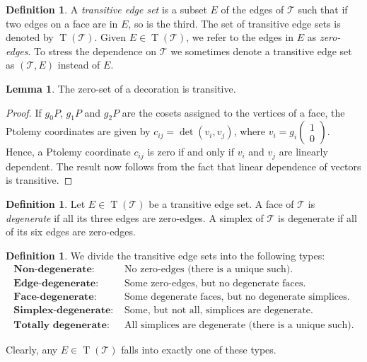 \documentclass[11pt]{amsart}
\theoremstyle{plain}
\theoremstyle{definition}
\newtheorem{lemma}[theorem]{Lemma}
\newtheorem{definition}[theorem]{Definition}
\numberwithin{equation}{section}
\newcommand{\T}{\mathcal T}
\DeclareMathOperator{\TE}{T}
\def\Ttildebar{\scalerel*{\widetilde{\overline\T}}{\widetilde{T^2}}}
\begin{document}
\begin{definition}\label{def:TransitiveEdgeSubset}
A \emph{transitive edge set} is a subset $E$ of the edges of $\T$ such that if two edges on a face are in $E$, so is the third. The set of transitive edge sets is denoted by $\TE(\T)$. Given $E\in\TE(\T)$, we refer to the edges in $E$ as \emph{zero-edges}. To stress the dependence on $\T$ we sometimes denote a transitive edge set as $(\T,E)$ instead of $E$.
\end{definition}

\begin{lemma}\label{lemma:TransitiveDec} The zero-set of a decoration is transitive.
\end{lemma}
\begin{proof}
If $g_0P$, $g_1P$ and $g_2P$ are the cosets assigned to the vertices of a face, the Ptolemy coordinates are given by $c_{ij}=\det(v_i,v_j)$, where $v_i=g_i\left(\begin{smallmatrix}1\\0\end{smallmatrix}\right)$. Hence, a Ptolemy coordinate $c_{ij}$ is zero if and only if $v_i$ and $v_j$ are linearly dependent. The result now follows from the fact that linear dependence of vectors is transitive.
\end{proof}

\begin{definition} Let $E\in\TE(\T)$ be a transitive edge set. A face of $\T$ is \emph{degenerate} if all its three edges are zero-edges. A simplex of $\T$ is degenerate if all of its six edges are zero-edges.
\end{definition}

\begin{definition}\label{def:PartitionType}
We divide the transitive edge sets into the following types:
\begin{align*}
\textbf{Non-degenerate:}& \text{ No zero-edges (there is a unique such).}\\
\textbf{Edge-degenerate:}& \text{ Some zero-edges, but no degenerate faces.}\\
\textbf{Face-degenerate:}& \text{ Some degenerate faces, but no degenerate simplices.}\\
\textbf{Simplex-degenerate:}& \text{ Some, but not all, simplices are degenerate.}\\
\textbf{Totally degenerate:}& \text{ All simplices are degenerate (there is a unique such).}
\end{align*}
\end{definition}
Clearly, any $E\in\TE(\T)$ falls into exactly one of these types.
\end{document}

